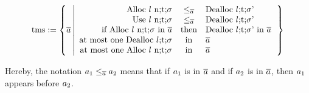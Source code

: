 \documentclass[utf8,acmsmall,review,screen,dvipsnames]{acmart}
\begin{document}
\begin{definition}\label{ap:def:trace:tmsdef}
  \begin{displaymath}
  \tmssafe:=\left\{\trace \left| \begin{array}{rcl}
                              \ev{Alloc\ \loc\ n;\sandboxtag;\securitytag}&\le_{\trace}&\ev{Dealloc\ \loc;\sandboxtag;\securitytag'} \\
                              \ev{Use\ \loc\ n;\sandboxtag;\securitytag}&\le_{\trace}&\ev{Dealloc\ \loc;\sandboxtag;\securitytag'} \\
                              \text{if }\ev{Alloc\ \loc\ n;\sandboxtag;\securitytag}\text{ in }\trace&\text{then}&\ev{Dealloc\ \loc;\sandboxtag;\securitytag'}\text{ in }\trace \\
                              \text{at most one }\ev{Dealloc\ \loc;\sandboxtag;\securitytag}&\text{in}&\trace \\
                              \text{at most one }\ev{Alloc\ \loc\ n;\sandboxtag;\securitytag}&\text{in}&\trace \\
                            \end{array}\right.\right\}
  \end{displaymath}
\end{definition}
Hereby, the notation $\event[_{1}]\le_{\trace}\event[_{2}]$ means that if $\event[_{1}]$ is in $\trace$ and if $\event[_{2}]$ is in $\trace$, then $\event[_{1}]$ appears before $\event[_{2}]$.
\end{document}
